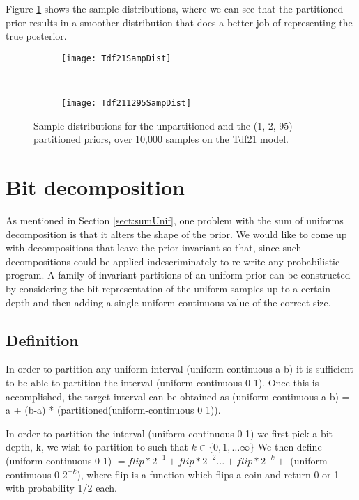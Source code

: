 Figure \ref{fig:tdf21PSampDist} shows the sample distributions, where we can see that the partitioned prior results in a smoother distribution that does a better job of representing the true posterior.

\begin{figure}[h]
    \centering
    \begin{subfigure}[t]{0.48\textwidth}
      \texttt{[image: Tdf21SampDist]}
    \end{subfigure}
    ~
    \begin{subfigure}[t]{0.48\textwidth}
      \texttt{[image: Tdf211295SampDist]}
    \end{subfigure}
    \caption{Sample distributions for the unpartitioned and the (1, 2, 95) partitioned priors, over 10,000 samples on the Tdf21 model.}
    \label{fig:tdf21PSampDist}
\end{figure}

\section{Bit decomposition}
\label{sect:bitDecomp}
As mentioned in Section \ref{sect:sumUnif}, one problem with the sum of uniforms decomposition is that it alters the shape of the prior. We would like to come up with decompositions that leave the prior invariant so that, since such decompositions could be applied indescriminately to re-write any probabilistic program. A family of invariant partitions of an uniform prior can be constructed by considering the bit representation of the uniform samples up to a certain depth and then adding a single uniform-continuous value of the correct size.

\subsection{Definition}
In order to partition any uniform interval (uniform-continuous a b) it is sufficient to be able to partition the interval (uniform-continuous 0 1). Once this is accomplished, the target interval can be obtained as (uniform-continuous a b) = a + (b-a) * (partitioned(uniform-continuous 0 1)).

In order to partition the interval (uniform-continuous 0 1) we first pick a bit depth, k, we wish to partition to such that $ k \in \{ 0, 1, \ldots \infty \} $ We then define (uniform-continuous 0 1) $= flip*2^{-1} + flip*2^{-2} \ldots + flip*2^{-k} +$ (uniform-continuous 0 $2^{-k}$), where flip is a function which flips a coin and return 0 or 1 with probability 1/2 each.

